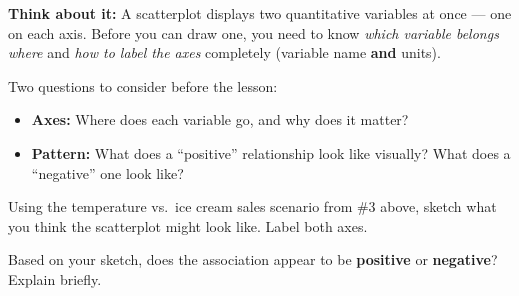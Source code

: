 \documentclass[10pt]{article}
\begin{document}
\begin{tcolorbox}[colback=greenbg, colframe=greenacc, boxrule=0.8pt, arc=2mm,
    left=4mm, right=4mm, top=3mm, bottom=3mm]
    \small
    \textbf{Think about it:} A scatterplot displays two quantitative variables at once ---
    one on each axis. Before you can draw one, you need to know \emph{which variable belongs
    where} and \emph{how to label the axes} completely (variable name \textbf{and} units).

    \vspace{6pt}
    Two questions to consider before the lesson:
    \begin{itemize}[leftmargin=1.3em, itemsep=4pt]
        \item \textbf{Axes:} Where does each variable go, and why does it matter?
        \item \textbf{Pattern:} What does a ``positive'' relationship look like visually?
              What does a ``negative'' one look like?
    \end{itemize}
\end{tcolorbox}

\vspace{0.16in}

\noindent Using the temperature vs.\ ice cream sales scenario from \#3 above, sketch what
you think the scatterplot might look like. Label both axes.

\vspace{0.12in}

\begin{center}
\end{center}

\vspace{0.1in}

\noindent Based on your sketch, does the association appear to be \textbf{positive} or
\textbf{negative}? Explain briefly.\\[8pt]
\writeline\\[2pt]\writeline
\end{document}

